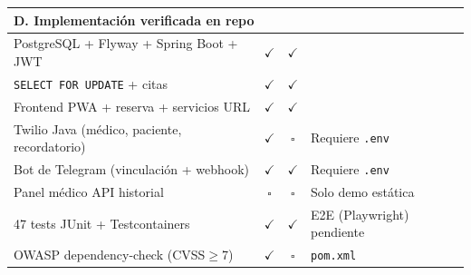 \begin{longtable}{@{}p{}ccp{}@{}}
\multicolumn{4}{l}{\textbf{\color{tealdark}D. Implementación verificada en repo}} \\
\midrule
PostgreSQL + Flyway + Spring Boot + JWT & $\checkmark$ & $\checkmark$ & \\
\texttt{SELECT FOR UPDATE} + citas & $\checkmark$ & $\checkmark$ & \\
Frontend PWA + reserva + servicios URL & $\checkmark$ & $\checkmark$ & \\
Twilio Java (médico, paciente, recordatorio) & $\checkmark$ & $\square$ & Requiere \texttt{.env} \\
Bot de Telegram (vinculación + webhook) & $\checkmark$ & $\checkmark$ & Requiere \texttt{.env} \\
Panel médico API historial & $\square$ & $\square$ & Solo demo estática \\
47 tests JUnit + Testcontainers & $\checkmark$ & $\checkmark$ & E2E (Playwright) pendiente \\
OWASP dependency-check (CVSS$\geq$7) & $\checkmark$ & $\square$ & \texttt{pom.xml} \\
\bottomrule
\end{longtable}

\normalsize
